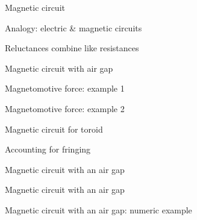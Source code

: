 \documentclass[compress]{beamer}
\begin{document}
{
    \begin{frame}{Magnetic circuit}
    \end{frame}
}

{
    \begin{frame}{Analogy: electric \& magnetic circuits}
    \end{frame}
}

{
    \begin{frame}{Reluctances combine like resistances}
    \end{frame}
}

{
    \begin{frame}{Magnetic circuit with air gap}
    \end{frame}
}

{
    \begin{frame}{Magnetomotive force: example 1}
    \end{frame}
}

{
    \begin{frame}{Magnetomotive force: example 2}
    \end{frame}
}

{
    \begin{frame}{Magnetic circuit for toroid}
    \end{frame}
}

{
    \begin{frame}{Accounting for fringing}
    \end{frame}
}

{
    \begin{frame}{Magnetic circuit with an air gap}
    \end{frame}
}

{
    \begin{frame}{Magnetic circuit with an air gap}
    \end{frame}
}

{
    \begin{frame}{Magnetic circuit with an air gap: numeric example}
    \end{frame}
}
\end{document}
